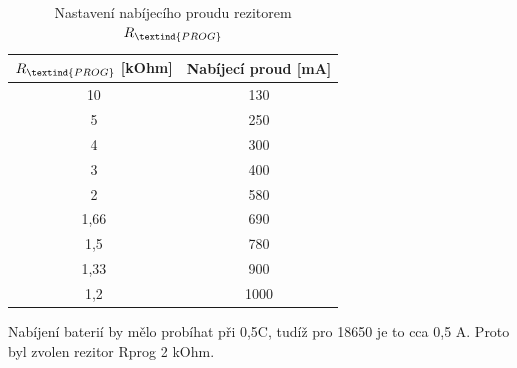 \begin{table}[!h]
    \caption{Nastavení nabíjecího proudu rezitorem $R_\textind{PROG}$}
    \begin{center}
        \begin{tabular}{|c|c|}
            \hline
            $R_\textind{PROG}$ [kOhm] & Nabíjecí proud [mA] \\
            \hline
            10      & 130 \\
            \hline
            5       & 250 \\
            \hline
            4       & 300 \\
            \hline
            3       & 400 \\
            \hline
            2       & 580 \\
            \hline
            1,66    & 690 \\
            \hline
            1,5     & 780 \\
            \hline
            1,33    & 900 \\
            \hline
            1,2     & 1000 \\
            \hline
        \end{tabular}
        
    \end{center}
\end{table}

Nabíjení baterií by mělo probíhat při 0,5C, tudíž pro 18650 je to cca 0,5 A. Proto byl zvolen rezitor Rprog 2 kOhm.
